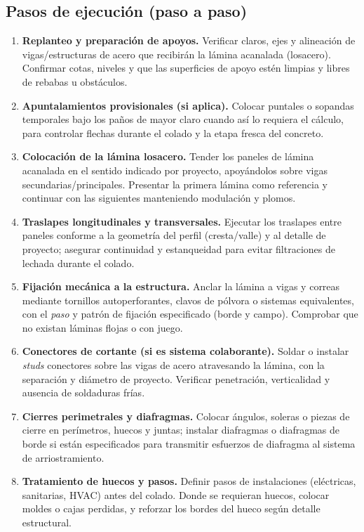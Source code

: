 \documentclass[12pt]{article}
\begin{document}
\subsection{Pasos de ejecución (paso a paso)}
\begin{enumerate}
	\item \textbf{Replanteo y preparación de apoyos.} Verificar claros, ejes y alineación de vigas/estructuras de acero que recibirán la lámina acanalada (losacero). Confirmar cotas, niveles y que las superficies de apoyo estén limpias y libres de rebabas u obstáculos.
	\item \textbf{Apuntalamientos provisionales (si aplica).} Colocar puntales o sopandas temporales bajo los paños de mayor claro cuando así lo requiera el cálculo, para controlar flechas durante el colado y la etapa fresca del concreto.
	\item \textbf{Colocación de la lámina losacero.} Tender los paneles de lámina acanalada en el sentido indicado por proyecto, apoyándolos sobre vigas secundarias/principales. Presentar la primera lámina como referencia y continuar con las siguientes manteniendo modulación y plomos.
	\item \textbf{Traslapes longitudinales y transversales.} Ejecutar los traslapes entre paneles conforme a la geometría del perfil (cresta/valle) y al detalle de proyecto; asegurar continuidad y estanqueidad para evitar filtraciones de lechada durante el colado.
	\item \textbf{Fijación mecánica a la estructura.} Anclar la lámina a vigas y correas mediante tornillos autoperforantes, clavos de pólvora o sistemas equivalentes, con el \emph{paso} y patrón de fijación especificado (borde y campo). Comprobar que no existan láminas flojas o con juego.
	\item \textbf{Conectores de cortante (si es sistema colaborante).} Soldar o instalar \emph{studs} conectores sobre las vigas de acero atravesando la lámina, con la separación y diámetro de proyecto. Verificar penetración, verticalidad y ausencia de soldaduras frías.
	\item \textbf{Cierres perimetrales y diafragmas.} Colocar ángulos, soleras o piezas de cierre en perímetros, huecos y juntas; instalar diafragmas o diafragmas de borde si están especificados para transmitir esfuerzos de diafragma al sistema de arriostramiento.
	\item \textbf{Tratamiento de huecos y pasos.} Definir pasos de instalaciones (eléctricas, sanitarias, HVAC) antes del colado. Donde se requieran huecos, colocar moldes o cajas perdidas, y reforzar los bordes del hueco según detalle estructural.

\end{enumerate}
\end{document}
